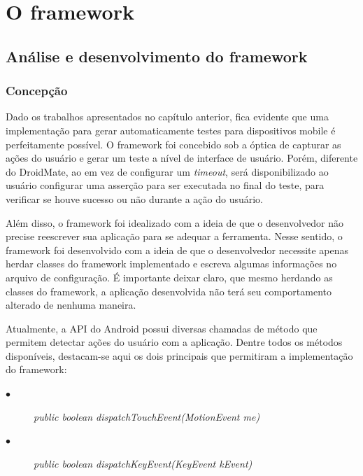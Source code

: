 \documentclass[
    12pt,       %
    openright,      %
    twoside,      %
    a4paper,      %
    english,      %
    french,       %
    spanish,      %
    brazil,       %
    ]{abntex2}
\begin{document}
  \part{O framework}
    \chapter{Análise e desenvolvimento do framework}
      \section{Concepção}
        Dado os trabalhos apresentados no capítulo anterior, fica evidente que uma implementação
        para gerar automaticamente testes para dispositivos mobile é perfeitamente possível. O
        framework foi concebido sob a óptica de capturar as ações do usuário e gerar um teste
        a nível de interface de usuário. Porém, diferente do DroidMate, ao em vez de configurar
        um \textit{timeout}, será disponibilizado ao usuário configurar uma asserção para ser
        executada no final do teste, para verificar se houve sucesso ou não durante a ação
        do usuário.

        Além disso, o framework foi idealizado com a ideia de que o desenvolvedor não precise
        reescrever sua aplicação para se adequar a ferramenta. Nesse sentido, o framework
        foi desenvolvido com a ideia de que o desenvolvedor necessite apenas herdar classes
        do framework implementado e escreva algumas informações no arquivo de configuração.
        É importante deixar claro, que mesmo herdando as classes do framework, a aplicação
        desenvolvida não terá seu comportamento alterado de nenhuma maneira.

        Atualmente, a API do Android possui diversas chamadas de método que permitem detectar
        ações do usuário com a aplicação. Dentre todos os métodos disponíveis, destacam-se aqui
        os dois principais que permitiram a implementação do framework: \par
        \begin{description}
          \item[$\bullet$] \textit{public boolean dispatchTouchEvent(MotionEvent me)}
          \item[$\bullet$] \textit{public boolean dispatchKeyEvent(KeyEvent kEvent)}
        \end{description}
\end{document}
